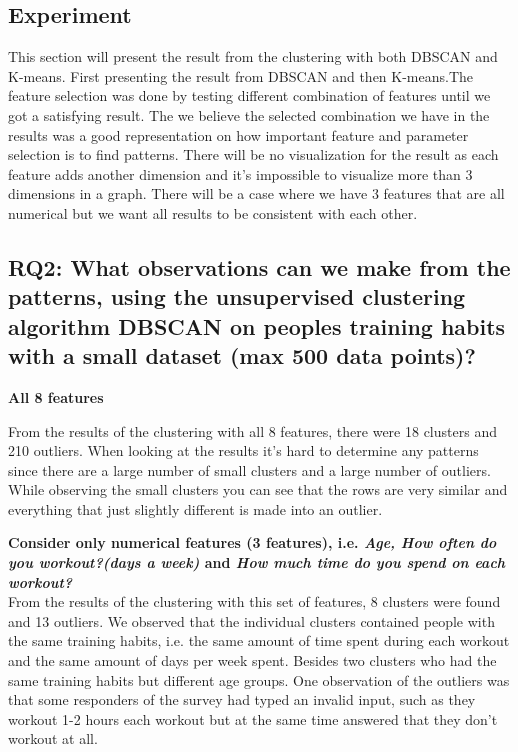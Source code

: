 \documentclass[a4paper]{article}
\begin{document}
\newpage
\subsection{Experiment}
This section will present the result from the clustering with both DBSCAN and K-means. First presenting the result from DBSCAN and then K-means.The feature selection was done by testing different combination of features until we got a satisfying result. The we believe the selected combination we have in the results was a good representation on how important feature and parameter selection is to find patterns. There will be no visualization for the result as each feature adds another dimension and it's impossible to visualize more than 3 dimensions in a graph. There will be a case where we have 3 features that are all numerical but we want all results to be consistent with each other.\newline

\subsection{RQ2: What observations can we make from the patterns, using the unsupervised clustering algorithm DBSCAN on peoples training habits with a small dataset (max 500 data points)?}

\textbf{All 8 features}


From the results of the clustering with all 8 features, there were 18 clusters and 210 outliers. When looking at the results it's hard to determine any patterns since there are a large number of small clusters and a large number of outliers. While observing the small clusters you can see that the rows are very similar and everything that just slightly different is made into an outlier.

\textbf{Consider only numerical features (3 features), i.e. \textit{Age, How often do you workout?(days 
a week)} and \textit{How much time do you spend on each workout?}}\newline\\
From the results of the clustering with this set of features, 8 clusters were found and 13 outliers. We observed that the individual clusters contained people with the same training habits, i.e. the same amount of time spent during each workout and the same amount of days per week spent. Besides two clusters who had the same training habits but different age groups. One observation of the outliers was that some responders of the survey had typed an invalid input, such as they workout 1-2 hours each workout but at the same time answered that they don't workout at all.
\end{document}
